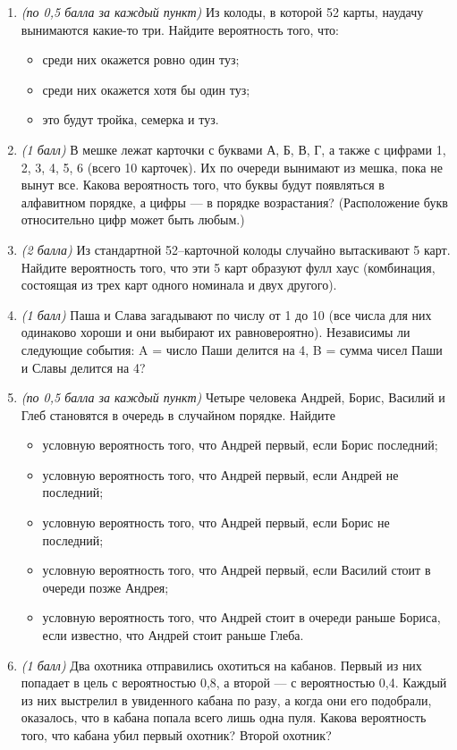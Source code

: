 \documentclass{article}
\begin{document}
  \begin{enumerate}
    \item \textit{(по 0,5 балла за каждый пункт)} Из колоды, в которой 52 карты, наудачу вынимаются какие-то три. Найдите вероятность того, что:
    \begin{itemize}
        \item среди них окажется ровно один туз;
        \item среди них окажется хотя бы один туз;
        \item это будут тройка, семерка и туз.
    \end{itemize}
    \item \textit{(1 балл)} В мешке лежат карточки с буквами А, Б, В, Г, а также с цифрами 1, 2,
    3, 4, 5, 6 (всего 10 карточек). Их по очереди вынимают из мешка, пока не вынут
    все. Какова вероятность того, что буквы будут появляться в алфавитном порядке,
    а цифры — в порядке возрастания? (Расположение букв относительно цифр может
    быть любым.)
    \item \textit{(2 балла)} Из стандартной 52–карточной колоды случайно вытаскивают 5 карт. Найдите вероятность того, что эти 5 карт образуют фулл хаус (комбинация, состоящая
    из трех карт одного номинала и двух другого).
    \item \textit{(1 балл)} Паша и Слава загадывают по числу от 1 до 10 (все числа для них одинаково
    хороши и они выбирают их равновероятно). Независимы ли следующие события:
    A = число Паши делится на 4,
    B = сумма чисел Паши и Славы делится на 4?
    \item \textit{(по 0,5 балла за каждый пункт)} Четыре человека Андрей, Борис, Василий и Глеб
    становятся в очередь в случайном порядке. Найдите
    \begin{itemize}
        \item условную вероятность того, что Андрей первый, если Борис последний;
        \item условную вероятность того, что Андрей первый, если Андрей не последний;
        \item условную вероятность того, что Андрей первый, если Борис не последний;
        \item условную вероятность того, что Андрей первый, если Василий стоит в очереди
        позже Андрея;
        \item условную вероятность того, что Андрей стоит в очереди раньше Бориса, если
        известно, что Андрей стоит раньше Глеба.
    \end{itemize}
    \item \textit{(1 балл)} Два охотника отправились охотиться на кабанов. Первый из них попадает в
    цель с вероятностью 0,8, а второй — с вероятностью 0,4. Каждый из них выстрелил
    в увиденного кабана по разу, а когда они его подобрали, оказалось, что в кабана
    попала всего лишь одна пуля. Какова вероятность того, что кабана убил первый
    охотник? Второй охотник?
  \end{enumerate}
\end{document}

